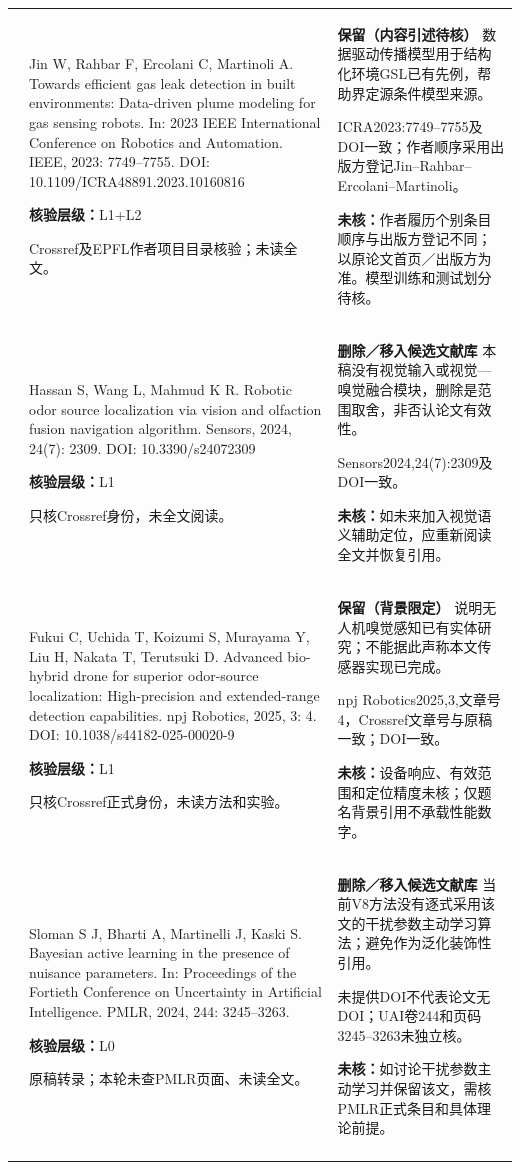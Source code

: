 \begin{longtable}{@{}>{\raggedright\arraybackslash}p{0.7cm}>{\raggedright\arraybackslash}p{7.0cm}>{\raggedright\arraybackslash}p{7.8cm}@{}}
9 & Jin W, Rahbar F, Ercolani C, Martinoli A. Towards efficient gas leak detection in built environments: Data-driven plume modeling for gas sensing robots. In: 2023 IEEE International Conference on Robotics and Automation. IEEE, 2023: 7749–7755. DOI: 10.1109/ICRA48891.2023.10160816\par\textbf{核验层级：}L1+L2\par Crossref及EPFL作者项目目录核验；未读全文。 & \textbf{保留（内容引述待核）} 数据驱动传播模型用于结构化环境GSL已有先例，帮助界定源条件模型来源。\par ICRA2023:7749–7755及DOI一致；作者顺序采用出版方登记Jin–Rahbar–Ercolani–Martinoli。\par\textbf{未核：}作者履历个别条目顺序与出版方登记不同；以原论文首页／出版方为准。模型训练和测试划分待核。 \\\addlinespace[6pt]
10 & Hassan S, Wang L, Mahmud K R. Robotic odor source localization via vision and olfaction fusion navigation algorithm. Sensors, 2024, 24(7): 2309. DOI: 10.3390/s24072309\par\textbf{核验层级：}L1\par 只核Crossref身份，未全文阅读。 & \textbf{删除／移入候选文献库} 本稿没有视觉输入或视觉—嗅觉融合模块，删除是范围取舍，非否认论文有效性。\par Sensors2024,24(7):2309及DOI一致。\par\textbf{未核：}如未来加入视觉语义辅助定位，应重新阅读全文并恢复引用。 \\\addlinespace[6pt]
11 & Fukui C, Uchida T, Koizumi S, Murayama Y, Liu H, Nakata T, Terutsuki D. Advanced bio-hybrid drone for superior odor-source localization: High-precision and extended-range detection capabilities. npj Robotics, 2025, 3: 4. DOI: 10.1038/s44182-025-00020-9\par\textbf{核验层级：}L1\par 只核Crossref正式身份，未读方法和实验。 & \textbf{保留（背景限定）} 说明无人机嗅觉感知已有实体研究；不能据此声称本文传感器实现已完成。\par npj Robotics2025,3,文章号4，Crossref文章号与原稿一致；DOI一致。\par\textbf{未核：}设备响应、有效范围和定位精度未核；仅题名背景引用不承载性能数字。 \\\addlinespace[6pt]
12 & Sloman S J, Bharti A, Martinelli J, Kaski S. Bayesian active learning in the presence of nuisance parameters. In: Proceedings of the Fortieth Conference on Uncertainty in Artificial Intelligence. PMLR, 2024, 244: 3245–3263.\par\textbf{核验层级：}L0\par 原稿转录；本轮未查PMLR页面、未读全文。 & \textbf{删除／移入候选文献库} 当前V8方法没有逐式采用该文的干扰参数主动学习算法；避免作为泛化装饰性引用。\par 未提供DOI不代表论文无DOI；UAI卷244和页码3245–3263未独立核。\par\textbf{未核：}如讨论干扰参数主动学习并保留该文，需核PMLR正式条目和具体理论前提。 \\\addlinespace[6pt]

\end{longtable}
